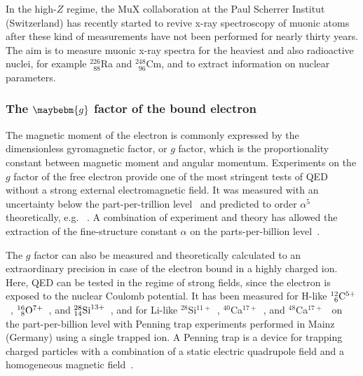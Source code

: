 In the high-$Z$ regime, the MuX collaboration at the Paul Scherrer Institut (Switzerland) has recently started to revive x-ray spectroscopy of muonic atoms after these kind of measurements have not been performed for nearly thirty years.
The aim is to measure muonic x-ray spectra for the heaviest and also radioactive nuclei, for example $^{226}_{\phantom{1}88}$Ra and $^{248}_{\phantom{1}96}$Cm, and to extract information on nuclear parameters. 

\subsubsection*{The $\maybebm{g}$ factor of the bound electron}
The magnetic moment of the electron is commonly expressed by the dimensionless gyromagnetic factor, or $g$ factor, which is the proportionality constant between magnetic moment and angular momentum. Experiments on the $g$ factor of the free electron provide one of the most stringent tests of QED without a strong external electromagnetic field. It was measured with an uncertainty below the part-per-trillion level~\cite{odom2006,hanneke2008} and predicted to order $\alpha^5$ theoretically, e.g.~  \cite{schwinger1948,Peterman57,Sommerfield1957,Sommerfield58,Laporta96,kinoshita2006,aoyama2007,aoyama2015,aoyama2017}. A combination of experiment and theory has allowed the extraction of the fine-structure constant $\alpha$ on the parts-per-billion level~\cite{gabrielse2006,gabrielse2007}.

The $g$ factor can also be measured and theoretically calculated to an extraordinary precision in case of the electron bound in a highly charged ion. Here, QED can be tested in the regime of strong fields, since the electron is exposed to the nuclear Coulomb potential. It has been measured for H-like $^{12}_{\phantom{0}6}\rm{C}^{5+}$~\cite{Haffner2000,Sturm2014}, $^{16}_{\phantom{0}8}\rm{O}^{7+}$~\cite{Verdu2004}, and $^{28}_{14}\rm{Si}^{13+}$~\cite{Sturm2011}, and for Li-like $^{28}$Si$^{11+}$~\cite{sturm2013}, $^{40}$Ca$^{17+}$~\cite{Kohler2016}, and $^{48}$Ca$^{17+}$~\cite{Kohler2016} on the part-per-billion level with Penning trap experiments performed in Mainz (Germany) using a single trapped ion. A Penning trap is a device for trapping charged particles with a combination of a static electric quadrupole field and a homogeneous magnetic field~\cite{annphysgfactor,geoniumtheory}. 

